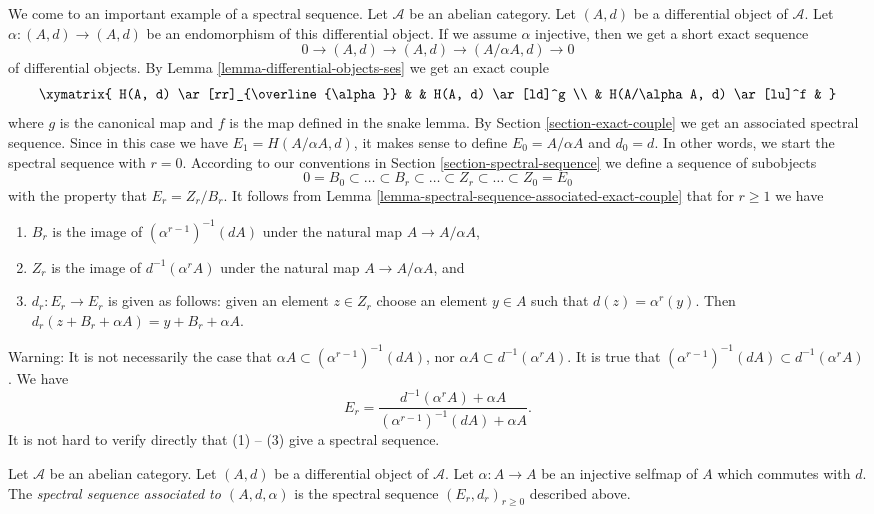 \noindent
We come to an important example of a spectral sequence.
Let $\mathcal{A}$ be an abelian category.
Let $(A, d)$ be a differential object of $\mathcal{A}$.
Let $\alpha : (A, d) \to (A, d)$ be an endomorphism of this differential
object. If we assume $\alpha$ injective, then we get a short exact sequence
$$
0 \to (A, d) \to (A, d) \to (A/\alpha A, d) \to 0
$$
of differential objects. By
Lemma \ref{lemma-differential-objects-ses} we get an exact couple
$$
\xymatrix{
H(A, d) \ar[rr]_{\overline{\alpha}} & & H(A, d) \ar[ld]^g \\
& H(A/\alpha A, d) \ar[lu]^f &
}
$$
where $g$ is the canonical map and $f$ is the map defined in the snake lemma.
By Section \ref{section-exact-couple} we get an associated spectral sequence.
Since in this case we have $E_1 = H(A/\alpha A, d)$,
it makes sense to define $E_0 = A/\alpha A$ and $d_0 = d$.
In other words, we start the spectral sequence
with $r = 0$. According to our conventions in
Section \ref{section-spectral-sequence} we define a sequence of subobjects
$$
0 = B_0 \subset \ldots \subset B_r \subset \ldots
\subset Z_r \subset \ldots \subset Z_0 = E_0
$$
with the property that $E_r = Z_r/B_r$. It follows from
Lemma \ref{lemma-spectral-sequence-associated-exact-couple}
that for $r \geq 1$ we have
\begin{enumerate}
\item $B_r$ is the image of $(\alpha^{r - 1})^{-1}(d A)$
under the natural map $A \to A/\alpha A$,
\item $Z_r$ is the image of $d^{-1}(\alpha^r A)$
under the natural map $A \to A/\alpha A$, and
\item $d_r : E_r \to E_r$ is given as follows: given an element $z \in Z_r$
choose an element $y \in A$ such that $d(z) = \alpha^r(y)$. Then
$d_r(z + B_r + \alpha A) = y + B_r + \alpha A$.
\end{enumerate}
Warning: It is not necessarily the case that
$\alpha A \subset (\alpha^{r - 1})^{-1}(dA)$, nor
$\alpha A \subset d^{-1}(\alpha^r A)$. It is true that
$(\alpha^{r - 1})^{-1}(dA) \subset d^{-1}(\alpha^r A)$.
We have
$$
E_r
=
\frac{d^{-1}(\alpha^r A) + \alpha A}{(\alpha^{r - 1})^{-1}(dA) + \alpha A}.
$$
It is not hard to verify directly that (1) -- (3) give a spectral sequence.

\begin{definition}
\label{definition-differential-object-selfmap}
Let $\mathcal{A}$ be an abelian category.
Let $(A, d)$ be a differential object of $\mathcal{A}$.
Let $\alpha : A \to A$ be an injective selfmap of $A$ which
commutes with $d$. The {\it spectral sequence associated to
$(A, d, \alpha)$} is the spectral sequence
$(E_r, d_r)_{r \geq 0}$ described above.
\end{definition}

